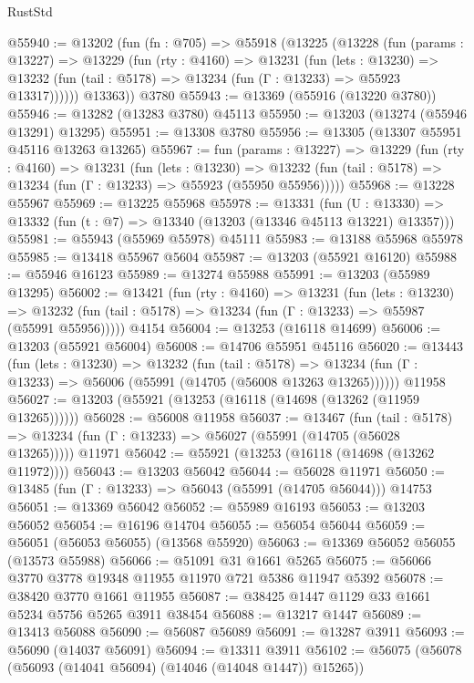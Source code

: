 \begin{lexlean}{RustStd}
\begin{coremodule}
@55940 := @13202
    (fun (fn : @705) =>
    @55918
      (@13225
        (@13228
          (fun (params : @13227) =>
          @13229
            (fun (rty : @4160) =>
            @13231
              (fun (lets : @13230) =>
              @13232 (fun (tail : @5178) => @13234 (fun (Γ : @13233) => @55923 @13317))))))
        @13363))
    @3780
@55943 := @13369 (@55916 (@13220 @3780))
@55946 := @13282 (@13283 @3780) @45113
@55950 := @13203 (@13274 (@55946 @13291) @13295)
@55951 := @13308 @3780
@55956 := @13305 (@13307 @55951 @45116 @13263 @13265)
@55967 := fun (params : @13227) =>
  @13229
    (fun (rty : @4160) =>
    @13231
      (fun (lets : @13230) =>
      @13232 (fun (tail : @5178) => @13234 (fun (Γ : @13233) => @55923 (@55950 @55956)))))
@55968 := @13228 @55967
@55969 := @13225 @55968
@55978 := @13331
    (fun (U : @13330) => @13332 (fun (t : @7) => @13340 (@13203 (@13346 @45113 @13221) @13357)))
@55981 := @55943 (@55969 @55978) @45111
@55983 := @13188 @55968 @55978
@55985 := @13418 @55967 @5604
@55987 := @13203 (@55921 @16120)
@55988 := @55946 @16123
@55989 := @13274 @55988
@55991 := @13203 (@55989 @13295)
@56002 := @13421
    (fun (rty : @4160) =>
    @13231
      (fun (lets : @13230) =>
      @13232 (fun (tail : @5178) => @13234 (fun (Γ : @13233) => @55987 (@55991 @55956)))))
    @4154
@56004 := @13253 (@16118 @14699)
@56006 := @13203 (@55921 @56004)
@56008 := @14706 @55951 @45116
@56020 := @13443
    (fun (lets : @13230) =>
    @13232
      (fun (tail : @5178) =>
      @13234 (fun (Γ : @13233) => @56006 (@55991 (@14705 (@56008 @13263 @13265))))))
    @11958
@56027 := @13203 (@55921 (@13253 (@16118 (@14698 (@13262 (@11959 @13265))))))
@56028 := @56008 @11958
@56037 := @13467
    (fun (tail : @5178) => @13234 (fun (Γ : @13233) => @56027 (@55991 (@14705 (@56028 @13265)))))
    @11971
@56042 := @55921 (@13253 (@16118 (@14698 (@13262 @11972))))
@56043 := @13203 @56042
@56044 := @56028 @11971
@56050 := @13485 (fun (Γ : @13233) => @56043 (@55991 (@14705 @56044))) @14753
@56051 := @13369 @56042
@56052 := @55989 @16193
@56053 := @13203 @56052
@56054 := @16196 @14704
@56055 := @56054 @56044
@56059 := @56051 (@56053 @56055) (@13568 @55920)
@56063 := @13369 @56052 @56055 (@13573 @55988)
@56066 := @51091 @31 @1661 @5265
@56075 := @56066 @3770 @3778 @19348 @11955 @11970 @721 @5386 @11947 @5392
@56078 := @38420 @3770 @1661 @11955
@56087 := @38425 @1447 @1129 @33 @1661 @5234 @5756 @5265 @3911 @38454
@56088 := @13217 @1447
@56089 := @13413 @56088
@56090 := @56087 @56089
@56091 := @13287 @3911
@56093 := @56090 (@14037 @56091)
@56094 := @13311 @3911
@56102 := @56075 (@56078 (@56093 (@14041 @56094) (@14046 (@14048 @1447)) @15265))

\end{coremodule}
\end{lexlean}
